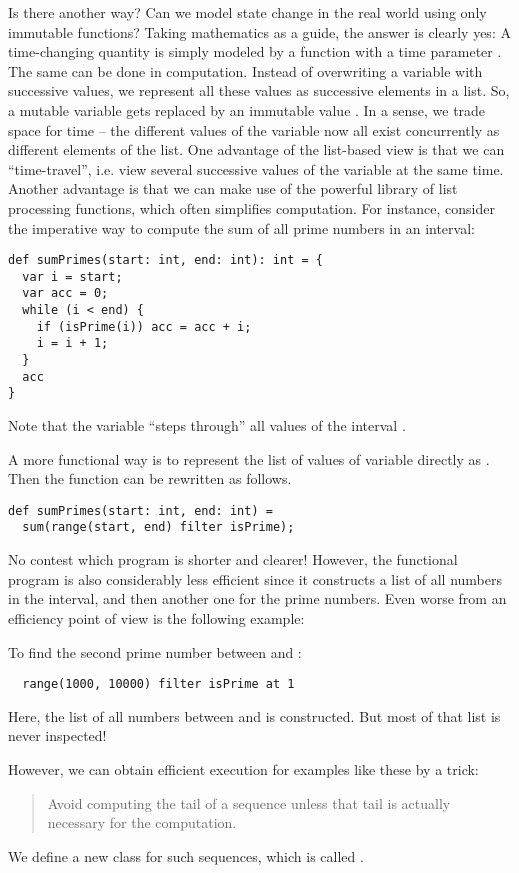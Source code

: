 {Is there another way? Can we model state change in the real world
using only immutable functions? Taking mathematics as a guide, the
answer is clearly yes: A time-changing quantity is simply modeled by
a function  with a time parameter . The same can be
done in computation. Instead of overwriting a variable with successive
values, we represent all these values as successive elements in a
list. So, a mutable variable  gets replaced by an
immutable value . In a sense, we trade space for
time -- the different values of the variable now all exist concurrently
as different elements of the list.  One advantage of the list-based
view is that we can ``time-travel'', i.e. view several successive
values of the variable at the same time. Another advantage is that we
can make use of the powerful library of list processing functions,
which often simplifies computation. For instance, consider the
imperative way to compute the sum of all prime numbers in an interval:
\begin{lstlisting}
def sumPrimes(start: int, end: int): int = {
  var i = start;
  var acc = 0;
  while (i < end) {
    if (isPrime(i)) acc = acc + i;
    i = i + 1;
  }
  acc
}
\end{lstlisting}
Note that the variable  ``steps through'' all values of the interval
.

A more functional way is to represent the list of values of variable  directly as . Then the function can be rewritten as follows.
\begin{lstlisting}
def sumPrimes(start: int, end: int) =
  sum(range(start, end) filter isPrime);
\end{lstlisting}

No contest which program is shorter and clearer!  However, the
functional program is also considerably less efficient since it
constructs a list of all numbers in the interval, and then another one
for the prime numbers. Even worse from an efficiency point of view is
the following example:

To find the second prime number between  and :
\begin{lstlisting}
  range(1000, 10000) filter isPrime at 1
\end{lstlisting}
Here, the list of all numbers between  and  is
constructed.  But most of that list is never inspected!

However, we can obtain efficient execution for examples like these by
a trick:
\begin{quote}
 Avoid computing the tail of a sequence unless that tail is actually
     necessary for the computation.
\end{quote}
We define a new class for such sequences, which is called .

}
